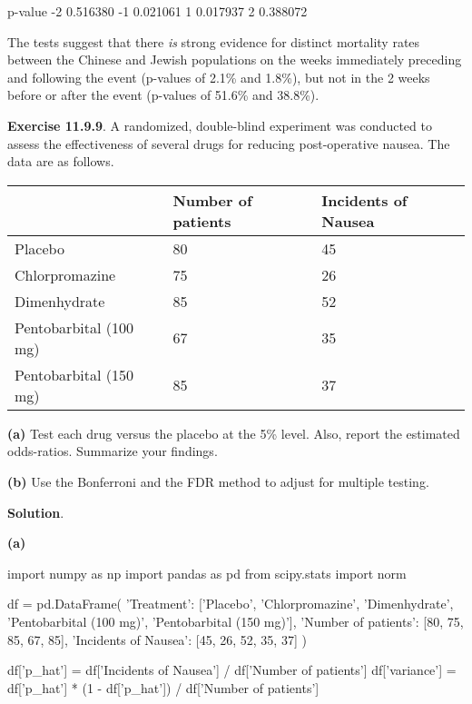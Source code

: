 \begin{console}
     p-value
-2  0.516380
-1  0.021061
 1  0.017937
 2  0.388072
\end{console}

The tests suggest that there \emph{is} strong evidence for distinct
mortality rates between the Chinese and Jewish populations on the weeks
immediately preceding and following the event (p-values of 2.1\% and
1.8\%), but not in the 2 weeks before or after the event (p-values of
51.6\% and 38.8\%).

\textbf{Exercise 11.9.9}. A randomized, double-blind experiment was
conducted to assess the effectiveness of several drugs for reducing
post-operative nausea. The data are as follows.

\begin{table}[H]
\centering
\begin{tabular}{@{}lll@{}}
\toprule
& Number of patients & Incidents of Nausea \\
\midrule
Placebo & 80 & 45 \\
Chlorpromazine & 75 & 26 \\
Dimenhydrate & 85 & 52 \\
Pentobarbital (100 mg) & 67 & 35 \\
Pentobarbital (150 mg) & 85 & 37 \\
\bottomrule
\end{tabular}
\end{table}

\textbf{(a)} Test each drug versus the placebo at the 5\% level. Also,
report the estimated odds-ratios. Summarize your findings.

\textbf{(b)} Use the Bonferroni and the FDR method to adjust for
multiple testing.

\textbf{Solution}.

\textbf{(a)}

\begin{python}
import numpy as np
import pandas as pd
from scipy.stats import norm

df = pd.DataFrame({
    'Treatment': ['Placebo', 'Chlorpromazine', 'Dimenhydrate', 
                  'Pentobarbital (100 mg)', 'Pentobarbital (150 mg)'],
    'Number of patients': [80, 75, 85, 67, 85],
    'Incidents of Nausea': [45, 26, 52, 35, 37]
})
\end{python}

\begin{python}
df['p_hat'] = df['Incidents of Nausea'] / df['Number of patients']
df['variance'] = df['p_hat'] * (1 - df['p_hat']) / df['Number of patients']
\end{python}

